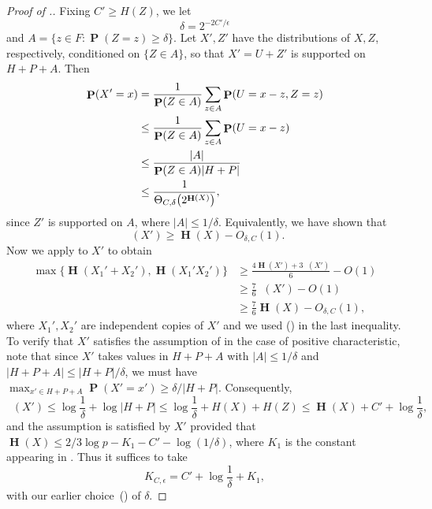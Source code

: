 \documentclass[twoside, 10pt]{article}
\renewcommand{\eqref}[1]{\textup{{\normalfont(\oldstylenums{\ref{#1}}}\normalfont)}}
\newcommand\eps{\epsilon}
\DeclareMathOperator{\Eta}{\mathbf{H}}
\DeclareMathOperator{\Etamin}{\mathbf{H}_\infty}
\DeclareMathOperator{\pr}{\mathbf{P}}
\begin{document}
\begin{proof}[Proof of .]
Fixing $C' \geq H(Z)$, we let
\begin{equation} \label{deltadef}
    \delta = 2^{-2C'/\eps}
\end{equation} 
and $A = \bigl\{z\in F :\pr(Z=z)\geq \delta\bigr\}.$
Let $X',Z'$ have the distributions of $X,Z$, respectively,
conditioned on $\{Z\in A\}$, so that
$X' = U+Z'$ is supported on $H+P+A$.
Then
\begin{align*}
\pr(X' = x)  &= \frac{1}{\pr(Z \in A)}\sum_{z \in A }\pr(U = x-z, Z = z) \\
&\leq \frac{1}{\pr(Z \in A)}\sum_{z \in A }\pr(U = x-z) \\
&\le \frac{|A|}{\pr(Z\in A)|H+P|}  \cr
&\le \frac{1} {\Theta_{C,\delta}\bigl(2^{\Eta(X)}\bigr)},
\end{align*}
since $Z'$ is supported on $A$, where $|A|\le 1/\delta$. 
Equivalently, we have shown that
\begin{equation} \label{XprimeHmin}
\Etamin(X') \geq \Eta(X) - O_{\delta, C}(1).
\end{equation}
Now we apply  to $X'$ to obtain
\begin{equation}\begin{aligned}
     \max\bigl\{ \Eta(X_1'+X_2'), \Eta( X_1'X_2') \bigr\} &\ge 
\frac{4 \Eta(X') + 3\Etamin(X')}{6} - O(1) \\
&\geq \frac{7}{6}\Etamin(X') - O(1)\\ \label{primefirstsp}
&\geq \frac{7}{6}\Eta(X) - O_{\delta,C}(1),
\end{aligned}\end{equation}
where $X_1',X_2'$ are independent copies of $X'$ and we used \eqref{XprimeHmin} in the last inequality. To verify that $X'$ satisfies the assumption of  in the case of positive characteristic, note that since $X'$ takes values in $H+P+A$ with $|A| \leq 1/\delta$ and $|H+P+A|\leq |H+P|/\delta$, we must have $\max_{x' \in H+P+A}\pr(X'=x') \geq \delta/|H+P|$.
Consequently,
$$\Etamin(X') \leq \log{\frac1\delta} + \log{|H+P|} \leq \log{\frac1\delta} + H(X)+H(Z) \leq \Eta(X) +C'+ \log{\frac{1}{\delta}},$$
and the assumption is satisfied by $X'$ provided that $\Eta(X) \leq 2/3\log{p} - K_1-C'-\log(1/\delta)$, where $K_1$ is the constant appearing in . Thus it suffices to take 
\begin{equation} \label{K1eps}
    K_{C,\eps} = C'+\log{\frac{1}{\delta}}+K_1,
\end{equation}
with our earlier choice~\eqref{deltadef} of $\delta$.



\end{proof}
\end{document}
